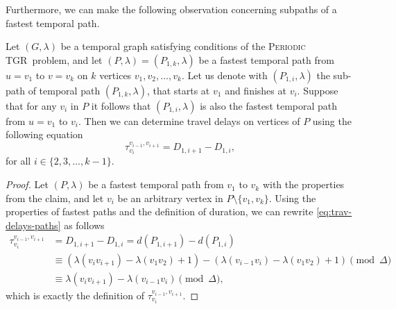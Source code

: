 \documentclass[a4paper,UKenglish,cleveref, autoref, thm-restate]{lipics-v2021}
\newcommand{\deltaExact}{\textsc{Periodic TGR}}
\begin{document}
Furthermore, we can make the following observation concerning subpaths of a fastest temporal path.

\begin{lemma} \label{lemma:unique-fastest-path-allDelays}
    Let $(G, \lambda)$ be a temporal graph satisfying conditions of the \deltaExact\ problem,
    and let $(P,\lambda)=(P_{1,k},\lambda)$ be a fastest temporal path from $u=v_1$ to $v=v_k$ on $k$ vertices $v_1,v_2,\dots,v_k$.
    Let us denote with $(P_{1,i}, \lambda)$ the sub-path of temporal path $(P_{1,k},\lambda)$, that starts at $v_1$ and finishes at $v_i$.
    Suppose that for any $v_i$ in $P$ it follows that $(P_{1,i}, \lambda)$ is also the fastest temporal path from $u=v_1$ to $v_i$.
    Then we can determine travel delays on vertices of $P$ using the following equation
    \begin{equation}\label{eq:trav-delays-paths}
        \tau_{v_i}^{v_{i-1},v_{i+1}} = D_{1,i+1} - D_{1,i},
    \end{equation}
    for all $i \in \{2,3, \dots, k-1\}$.
\end{lemma}

\begin{proof}
    Let $(P,\lambda)$ be a fastest temporal path from $v_1$ to $v_k$ with the properties from the claim, and let $v_i$ be an arbitrary vertex in $P \setminus \{v_1,v_k\}$.
    Using the properties of fastest paths and the definition of duration, we can rewrite \cref{eq:trav-delays-paths} as follows
    \begin{align*}
        \tau_{v_i}^{v_{i-1},v_{i+1}} & = D_{1,i+1} - D_{1,i} =  d(P_{1,i+1}) - d(P_{1,i}) \\
        & \equiv 
        \left(\lambda(v_{i}v_{i+1}) - \lambda(v_1v_2) + 1\right) -  
        \left(\lambda(v_{i-1}v_{i}) - \lambda(v_1v_2) + 1\right) \pmod \Delta \\
        & \equiv \lambda(v_{i}v_{i+1}) - \lambda(v_{i-1}v_{i}) \pmod \Delta,
        \end{align*}
    which is exactly the definition of $\tau_{v_i}^{v_{i-1},v_{i+1}}$.
\end{proof}
\end{document}
